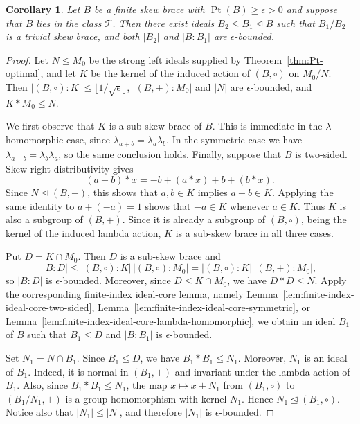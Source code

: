 \documentclass[10pt,a4paper]{amsart}
\numberwithin{equation}{section}
\newtheorem{cor}[equation]{Corollary}
\newcommand{\Pt}{\operatorname{Pt} }
\begin{document}
\begin{cor} %
Let $B$ be a finite skew brace with $\Pt(B)\geqslant\epsilon>0$ and suppose that $B$ lies in the class $\mathcal{T}$. Then there exist ideals $B_2\leqslant B_1\trianglelefteq B$ such that $B_1/B_2$ is a trivial skew brace, and both $|B_2|$ and $|B:B_1|$ are $\epsilon$-bounded.
\end{cor}

\begin{proof}
Let $N\leqslant M_0$ be the strong left ideals supplied by Theorem~\ref{thm:Pt-optimal}, and let
$K$ be the kernel of the induced action of $(B,\circ)$ on $M_0/N$. Then
$|(B,\circ):K|\leqslant\lfloor1/\sqrt{\epsilon}\rfloor$, $|(B,+):M_0|$ and $|N|$ are $\epsilon$-bounded, and $K*M_0\leqslant N$.

We first observe that $K$ is a sub-skew brace of $B$. This is immediate in the $\lambda$-homomorphic case, since $\lambda_{a+b}=\lambda_a\lambda_b$. In the symmetric case we have $\lambda_{a+b}=\lambda_b\lambda_a$, so the same conclusion holds. Finally, suppose that $B$ is two-sided. Skew right distributivity gives
$$
(a+b)*x=-b+(a*x)+b+(b*x).
$$
Since $N\unlhd(B,+)$, this shows that $a,b\in K$ implies $a+b\in K$. Applying the same identity to $a+(-a)=1$ shows that $-a\in K$ whenever $a\in K$. Thus $K$ is also a subgroup of $(B,+)$. Since it is already a subgroup of $(B,\circ)$, being the kernel of the induced lambda action, $K$ is a sub-skew brace in all three cases.

Put $D=K\cap M_0$. Then $D$ is a sub-skew brace and
$$
|B:D|
\leqslant |(B,\circ):K|\,|(B,\circ):M_0|
=
|(B,\circ):K|\,|(B,+):M_0|,
$$
so $|B:D|$ is $\epsilon$-bounded. Moreover, since $D\leqslant K\cap M_0$, we have $D*D\leqslant N$.
Apply the corresponding finite-index ideal-core lemma, namely Lemma~\ref{lem:finite-index-ideal-core-two-sided}, Lemma~\ref{lem:finite-index-ideal-core-symmetric}, or Lemma~\ref{lem:finite-index-ideal-core-lambda-homomorphic}, we obtain an ideal $B_1$ of $B$ such that $B_1\leqslant D$ and $|B:B_1|$ is $\epsilon$-bounded.

Set $N_1=N\cap B_1$. Since $B_1\leqslant D$, we have $B_1*B_1\leqslant N_1$. Moreover, $N_1$ is an ideal of $B_1$. Indeed, it is normal in $(B_1,+)$ and invariant under the lambda action of $B_1$. Also, since $B_1*B_1\leqslant N_1$, the map
$x\mapsto x+N_1$ from $(B_1,\circ)$ to $(B_1/N_1,+)$ is a group homomorphism with kernel $N_1$. Hence $N_1\unlhd(B_1,\circ)$. Notice also that $|N_1|\leqslant|N|$, and therefore $|N_1|$ is $\epsilon$-bounded.


\end{proof}
\end{document}
